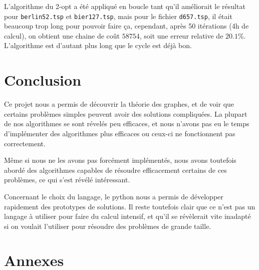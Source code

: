\documentclass{scrartcl}
\begin{document}
    L'algorithme du 2-opt a été appliqué en boucle tant qu'il améliorait le
    résultat pour \verb+berlin52.tsp+ et \verb+bier127.tsp+, mais pour le
    fichier \verb+d657.tsp+, il était beaucoup trop long pour pouvoir faire ça,
    cependant, après 50 itérations (4h de calcul), on obtient une chaine de coût
    $58754$, soit une erreur relative de $20.1\%$. L'algorithme est d'autant
    plus long que le cycle est déjà bon.

\section{Conclusion}
  Ce projet nous a permis de découvrir la théorie des graphes, et de voir que certains
  problèmes simples peuvent avoir des solutions compliquées. La plupart de
  nos algorithmes se sont révelés peu efficaces, et nous n'avons
  pas eu le temps d'implémenter des algorithmes plus efficaces ou ceux-ci ne
  fonctionnent pas correctement.
  
  Même si nous ne les avons pas forcément implémentés, nous avons toutefois
  abordé des algorithmes capables de résoudre efficacement certains de ces problèmes,
  ce qui s'est révélé intéressant.

  Concernant le choix du langage, le python nous a permis de développer
  rapidement des prototypes de solutions. Il reste toutefois clair que ce
  n'est pas un langage à utiliser pour faire du calcul intensif, et qu'il se
  révèlerait vite inadapté si on voulait l'utiliser pour résoudre des problèmes
  de grande taille.

\section{Annexes}
  \lstlistoflistings
  
  
  
  
  
  
  
\end{document}
